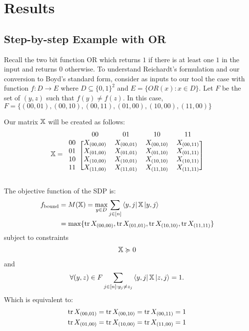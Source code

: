 \section{Results}

\subsection{Step-by-step Example with OR}
Recall the two bit function OR which returns $1$ if there
is at least one $1$ in the input and returns $0$ otherwise.
To understand Reichardt's formulation and our conversion
to Boyd's standard form, consider as inputs to our tool
the case with function $f: D \rightarrow E$ where
$D \subseteq {\{0,1\}}^2$ and $E =\{OR(x): x \in D \}$.
Let $F$ be the set of $(y,z)$ such that $f(y) \neq f(z)$. In this
case, $F = \{(00,01), (00,10), (00,11), (01,00), (10,00), (11,00)\}$

Our matrix $\operatorname{\mathbb{X}}$ will be created as follows:
\begin{align}
\X = \begin{blockarray}{ccccc}
\qquad & 00 & 01 & 10 & 11 \\
\begin{block}{c[cccc]}
  00 & X_{(00,00)} & X_{(00,01)} & X_{(00,10)} & X_{(00,11)}\\
  01 & X_{(01,00)} & X_{(01,01)} & X_{(01,10)} & X_{(01,11)}\\
  10 & X_{(10,00)} & X_{(10,01)} & X_{(10,10)} & X_{(10,11)}\\
  11 & X_{(11,00)} & X_{(11,01)} & X_{(11,10)} & X_{(11,11)}\\
\end{block}
\end{blockarray} \nonumber 
\end{align}


The objective function of the SDP is:
\begin{align} \label{eq:reichardtObj} 
    f_{\text{bound}} &= M(\operatorname{\mathbb{X}}) = \max_{y \in D} \sum_{j \in [n]}
    \bra{y,j}\operatorname{\mathbb{X}}\ket{y,j} \nonumber \\
    &= \max\{ \operatorname{\text{tr}}{X_{(00,00)}}, \operatorname{\text{tr}}{X_{(01,01)}}, \operatorname{\text{tr}}{X_{(10,10)}}, \operatorname{\text{tr}}{X_{(11,11)}} \} \nonumber
\end{align}
subject to constraints
\begin{align}
    \operatorname{\mathbb{X}} \succcurlyeq 0  \nonumber 
\end{align}
and
\begin{align}
    \forall (y,z) \in F \sum_{j \in [n]: y_j \ne z_j} 
    \bra{y,j} \operatorname{\mathbb{X}} \ket{z, j} = 1. \nonumber 
\end{align}
Which is equivalent to:
\begin{align}
    \operatorname{\text{tr}}{X_{(00,01)}} &= \operatorname{\text{tr}}{X_{(00,10)}} = \operatorname{\text{tr}}{X_{(00,11)}} = 1 \nonumber \\
    \operatorname{\text{tr}}{X_{(01,00)}} &= \operatorname{\text{tr}}{X_{(10,00)}} = \operatorname{\text{tr}}{X_{(11,00)}} = 1 \nonumber
\end{align}

